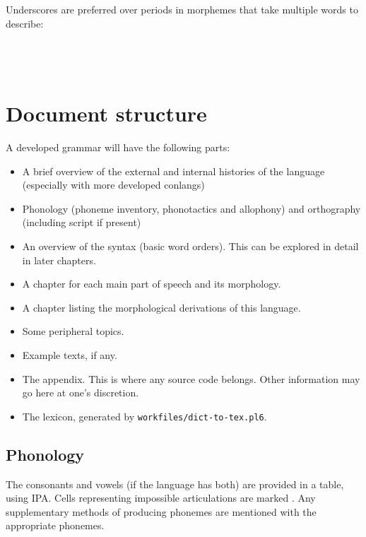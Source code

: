\documentclass{book}
\begin{document}
Underscores are preferred over periods in morphemes that take multiple words to describe:
~\\
 \\
       \hlviii{$>$} \\
      \\

\chapter{Document structure}

A developed grammar will have the following parts:

\begin{itemize}
  \item A brief overview of the external and internal histories of the language (especially with more developed conlangs)
  \item Phonology (phoneme inventory, phonotactics and allophony) and orthography (including script if present)
  \item An overview of the syntax (basic word orders). This can be explored in detail in later chapters.
  \item A chapter for each main part of speech and its morphology.
  \item A chapter listing the morphological derivations of this language.
  \item Some peripheral topics.
  \item Example texts, if any.
  \item The appendix. This is where any source code belongs. Other information may go here at one's discretion.
  \item The lexicon, generated by \texttt{workfiles/dict-to-tex.pl6}.
\end{itemize}

\section{Phonology}

The consonants and vowels (if the language has both) are provided in a table, using IPA. Cells representing impossible articulations are marked \texttt{}. Any supplementary methods of producing phonemes are mentioned with the appropriate phonemes.
\end{document}
